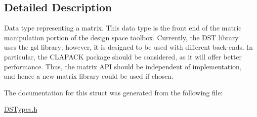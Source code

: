 \subsection{Detailed Description}
Data type representing a matrix. This data type is the front end of the matric manipulation portion of the design space toolbox. Currently, the DST library uses the gsl library; however, it is designed to be used with different back-\/ends. In particular, the CLAPACK package should be considered, as it will offer better performance. Thus, the matrix API should be independent of implementation, and hence a new matrix library could be used if chosen. 

The documentation for this struct was generated from the following file:\begin{DoxyCompactItemize}
\item 
\hyperlink{_d_s_types_8h}{DSTypes.h}\end{DoxyCompactItemize}
